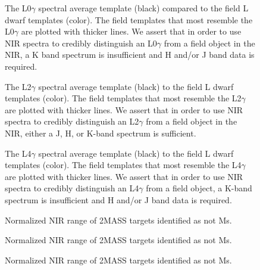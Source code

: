 \documentclass[12pt,preprint]{aastex}
\begin{document}

\begin{figure}
	\caption{The L0$\gamma$ spectral average template (black) compared to the field L dwarf templates (color). The field templates that most resemble the L0$\gamma$ are plotted with thicker lines. We assert that in order to use NIR spectra to credibly distinguish an L0$\gamma$ from a field object in the NIR, a K band spectrum is insufficient and H and/or J band data is required.}
	\label{fig:L0lg-field}
\end{figure}

\begin{figure}
	\caption{The L2$\gamma$ spectral average template (black) to the field L dwarf templates (color). The field templates that most resemble the L2$\gamma$ are plotted with thicker lines. We assert that in order to use NIR spectra to credibly distinguish an L2$\gamma$ from a field object in the NIR, either a J, H, or K-band spectrum is sufficient.}
	\label{fig:L2lg-field}
\end{figure}

\begin{figure}
	\caption{The L4$\gamma$ spectral average template (black) to the field L dwarf templates (color). The field templates that most resemble the L4$\gamma$ are plotted with thicker lines. We assert that in order to use NIR spectra to credibly distinguish an L4$\gamma$ from a field object, a K-band spectrum is insufficient and H and/or J band data is required.}
	\label{fig:L4lg-field}
\end{figure}


\begin{figure}
	\caption{Normalized NIR range of 2MASS targets identified as not Ms.}
	\label{fig:notMs_1}
\end{figure}

\begin{figure}
	\caption{Normalized NIR range of 2MASS targets identified as not Ms.}
\end{figure}

\begin{figure}
	\caption{Normalized NIR range of 2MASS targets identified as not Ms.}
\end{figure}
\end{document}

